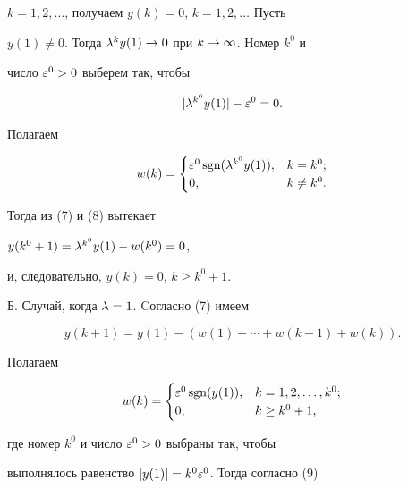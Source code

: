 $k =1,2,\dotsc$, получаем $y(k) = 0$, $k=1,2,\dotsc$ Пусть 


$y(1)\neq 0$. Тогда ${\lambda}^ky(1) \rightarrow 0$ при $k \rightarrow \infty$. Номер $k^0$ и


число $\varepsilon^0>0 $ выберем так, чтобы


\begin{equation}


|\l^{k^0}y(1)| - \ve^0 = 0.


\end{equation}


Полагаем


$$


w(k) =


\begin{cases}


\ve^0 \sgn(\l^{k^0}y(1)),& k = k^0;\\


0, & k \neq k^0.


\end{cases}


$$


Тогда из (7) и (8) вытекает


$y(k^0+1) = {\lambda}^{k^0}y(1) - w(k^0) = 0$,


и, следовательно, $y(k) = 0$, $k \geq k^0+1$.





Б. Случай, когда ${\lambda} = 1$. Cогласно (7) имеем


\begin{equation}


y(k+1) = y(1) - (w(1)+ \dotsb + w(k-1) + w(k)).


\end{equation}


Полагаем


$$


w(k) =


\begin{cases}


\ve^0 \sgn(y(1)),& k = 1, 2,\dotsc, k^0;\\


0, & k \geq k^0 +1,


\end{cases}


$$


где номер $k^0$ и число $\varepsilon^0>0$ выбраны так, чтобы


выполнялось равенство $|y(1)| = k^0\varepsilon^0$. Тогда согласно (9)


$$


